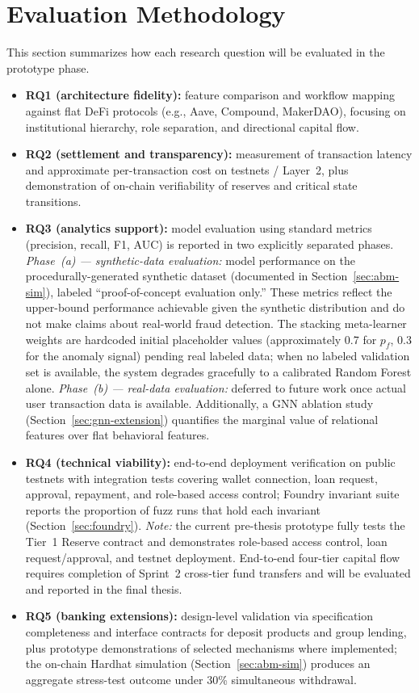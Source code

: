 \documentclass[12pt,a4paper]{report}
\begin{document}
\section{Evaluation Methodology}
\label{sec:eval-method}

This section summarizes how each research question will be evaluated in the prototype phase.
\begin{itemize}[noitemsep]
\item \textbf{RQ1 (architecture fidelity):} feature comparison and workflow mapping against flat DeFi protocols (e.g., Aave, Compound, MakerDAO), focusing on institutional hierarchy, role separation, and directional capital flow.
\item \textbf{RQ2 (settlement and transparency):} measurement of transaction latency and approximate per-transaction cost on testnets / Layer~2, plus demonstration of on-chain verifiability of reserves and critical state transitions.
\item \textbf{RQ3 (analytics support):} model evaluation using standard metrics (precision, recall, F1, AUC) is reported in two explicitly separated phases. \textit{Phase~(a) --- synthetic-data evaluation:} model performance on the procedurally-generated synthetic dataset (documented in Section~\ref{sec:abm-sim}), labeled ``proof-of-concept evaluation only.'' These metrics reflect the upper-bound performance achievable given the synthetic distribution and do not make claims about real-world fraud detection. The stacking meta-learner weights are hardcoded initial placeholder values (approximately 0.7 for $p_f$, 0.3 for the anomaly signal) pending real labeled data; when no labeled validation set is available, the system degrades gracefully to a calibrated Random Forest alone. \textit{Phase~(b) --- real-data evaluation:} deferred to future work once actual user transaction data is available. Additionally, a GNN ablation study (Section~\ref{sec:gnn-extension}) quantifies the marginal value of relational features over flat behavioral features.
\item \textbf{RQ4 (technical viability):} end-to-end deployment verification on public testnets with integration tests covering wallet connection, loan request, approval, repayment, and role-based access control; Foundry invariant suite reports the proportion of fuzz runs that hold each invariant (Section~\ref{sec:foundry}). \textit{Note:} the current pre-thesis prototype fully tests the Tier~1 Reserve contract and demonstrates role-based access control, loan request/approval, and testnet deployment. End-to-end four-tier capital flow requires completion of Sprint~2 cross-tier fund transfers and will be evaluated and reported in the final thesis.
\item \textbf{RQ5 (banking extensions):} design-level validation via specification completeness and interface contracts for deposit products and group lending, plus prototype demonstrations of selected mechanisms where implemented; the on-chain Hardhat simulation (Section~\ref{sec:abm-sim}) produces an aggregate stress-test outcome under 30\% simultaneous withdrawal.
\end{itemize}
\end{document}
